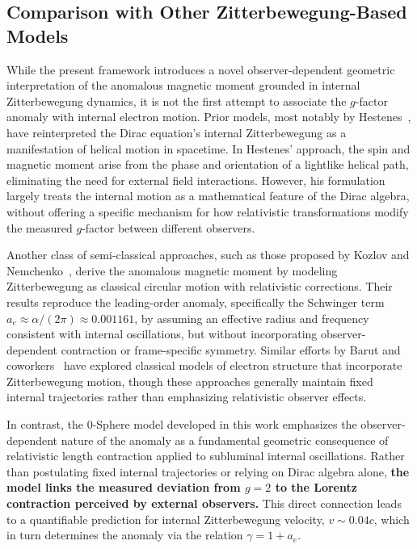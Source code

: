 \documentclass[%
 reprint,
 amsmath,amssymb,
 aps,
]{revtex4-1}
\numberwithin{equation}{section}%
\begin{document}
\subsection{Comparison with Other Zitterbewegung-Based Models}

While the present framework introduces a novel observer-dependent geometric interpretation of the anomalous magnetic moment grounded in internal Zitterbewegung dynamics, it is not the first attempt to associate the $g$-factor anomaly with internal electron motion. Prior models, most notably by Hestenes~\cite{hestenes1990,hestenes2010}, have reinterpreted the Dirac equation's internal Zitterbewegung as a manifestation of helical motion in spacetime. In Hestenes' approach, the spin and magnetic moment arise from the phase and orientation of a lightlike helical path, eliminating the need for external field interactions. However, his formulation largely treats the internal motion as a mathematical feature of the Dirac algebra, without offering a specific mechanism for how relativistic transformations modify the measured $g$-factor between different observers.

Another class of semi-classical approaches, such as those proposed by Kozlov and Nemchenko~\cite{kozlov2012}, derive the anomalous magnetic moment by modeling Zitterbewegung as classical circular motion with relativistic corrections. Their results reproduce the leading-order anomaly, specifically the Schwinger term~\cite{schwinger1948} $a_e \approx \alpha/(2\pi) \approx 0.001161$, by assuming an effective radius and frequency consistent with internal oscillations, but without incorporating observer-dependent contraction or frame-specific symmetry. Similar efforts by Barut and coworkers~\cite{barut1981,barut1984} have explored classical models of electron structure that incorporate Zitterbewegung motion, though these approaches generally maintain fixed internal trajectories rather than emphasizing relativistic observer effects.

In contrast, the 0-Sphere model developed in this work emphasizes the observer-dependent nature of the anomaly as a fundamental geometric consequence of relativistic length contraction applied to subluminal internal oscillations. Rather than postulating fixed internal trajectories or relying on Dirac algebra alone, \textbf{the model links the measured deviation from $g = 2$ to the Lorentz contraction perceived by external observers.} This direct connection leads to a quantifiable prediction for internal Zitterbewegung velocity, $v \sim 0.04c$, which in turn determines the anomaly via the relation $\gamma = 1 + a_e$.
\end{document}
